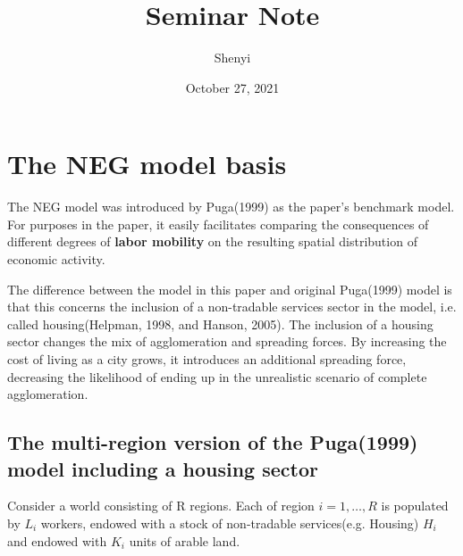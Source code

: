 \documentclass[twocolumn]{article}
\title{Seminar Note}
\author{Shenyi}
\date{October 27, 2021}
\begin{document}

\section{The NEG model basis}

The NEG model was introduced by Puga(1999) as the paper's benchmark model. For purposes in the paper, it easily facilitates comparing the consequences of different degrees of \textbf{labor mobility} on the resulting spatial distribution of economic activity.

The difference between the model in this paper and original Puga(1999) model is that this concerns the inclusion of a non-tradable services sector in the model, i.e. called housing(Helpman, 1998, and Hanson, 2005). The inclusion of a housing sector changes the mix of agglomeration and spreading forces. By increasing the cost of living as a city grows, it introduces an additional spreading force, decreasing the likelihood of ending up in the unrealistic scenario of complete agglomeration.

\subsection{The multi-region version of the Puga(1999) model including a housing sector}
Consider a world consisting of R regions. Each of region $i=1,\ldots ,R$ is populated by $L_i$ workers, endowed with a stock of non-tradable services(e.g. Housing) $H_i$ and endowed with $K_i$ units of arable land.
\end{document}
